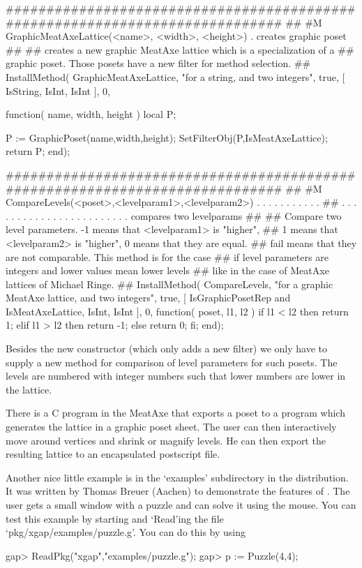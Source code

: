 #############################################################################
##
#M  GraphicMeatAxeLattice(<name>, <width>, <height>)  . creates graphic poset
##
##  creates a new graphic MeatAxe lattice which is a specialization of a
##  graphic poset. Those posets have a new filter for method selection.
##
InstallMethod( GraphicMeatAxeLattice,
    "for a string, and two integers",
    true,
    [ IsString,
      IsInt,
      IsInt ],
    0,

function( name, width, height )
  local P;

  P := GraphicPoset(name,width,height);
  SetFilterObj(P,IsMeatAxeLattice);
  return P;
end);

#############################################################################
##
#M  CompareLevels(<poset>,<levelparam1>,<levelparam2>)  . . . . . . . . . . .
##  . . . . . . . . . . . . . . . . . . . . . . . .  compares two levelparams
##
##  Compare two level parameters. -1 means that <levelparam1> is "higher", 
##  1 means that <levelparam2> is "higher", 0 means that they are equal. 
##  fail means that they are not comparable. This method is for the case 
##  if level parameters are integers and lower values mean lower levels 
##  like in the case of MeatAxe lattices of Michael Ringe.
##
InstallMethod( CompareLevels,
    "for a graphic MeatAxe lattice, and two integers",
    true,
    [ IsGraphicPosetRep and IsMeatAxeLattice, IsInt, IsInt ],
    0,
function( poset, l1, l2 )
  if l1 < l2 then
    return 1;
  elif l1 > l2 then
    return -1;
  else
    return 0;
  fi;
end);
\endtt

Besides the new constructor (which only adds a new filter) we only have to
supply a new method for comparison of level parameters for such posets. The 
levels are numbered with integer numbers such that lower numbers are lower
in the lattice.

There is a C program in the MeatAxe that exports a poset to a {\GAP}
program which generates the lattice in a graphic poset sheet. The user can
then interactively move around vertices and shrink or magnify levels. He
can then export the resulting lattice to an encapsulated postscript file.

Another nice little example is in the `examples' subdirectory in the
{\XGAP} distribution. It was written by Thomas Breuer (Aachen) to
demonstrate the features of {\XGAP}. The user gets a small window with a
puzzle and can solve it using the mouse. You can test this example by
starting {\XGAP} and `Read'ing the file `pkg/xgap/examples/puzzle.g'.
You can do this by using

\begintt
gap> ReadPkg("xgap","examples/puzzle.g");
gap> p := Puzzle(4,4);
\endtt



